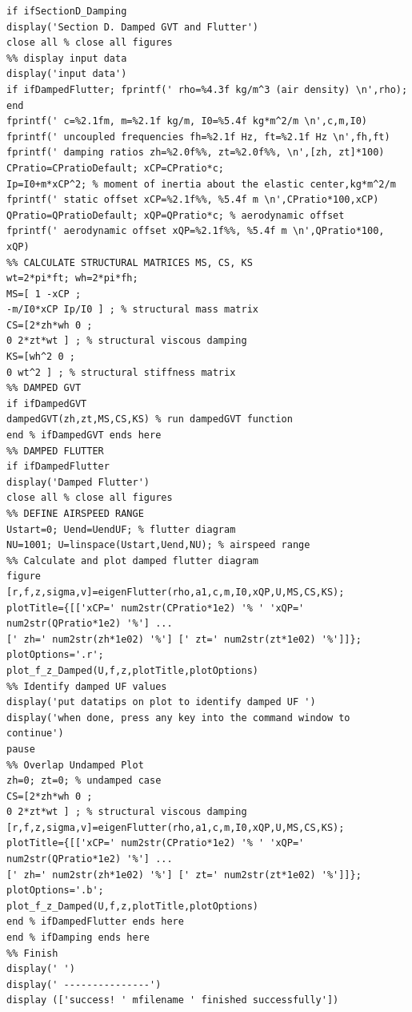 \documentclass{article}
\begin{document}
\begin{lstlisting}[caption={Main analysis script for Homework 1.}, label={lst:main_script}]
%% Section D: include damping
if ifSectionD_Damping
display('Section D. Damped GVT and Flutter')
close all % close all figures
%% display input data
display('input data')
if ifDampedFlutter; fprintf(' rho=%4.3f kg/m^3 (air density) \n',rho); end
fprintf(' c=%2.1fm, m=%2.1f kg/m, I0=%5.4f kg*m^2/m \n',c,m,I0)
fprintf(' uncoupled frequencies fh=%2.1f Hz, ft=%2.1f Hz \n',fh,ft)
fprintf(' damping ratios zh=%2.0f%%, zt=%2.0f%%, \n',[zh, zt]*100)
CPratio=CPratioDefault; xCP=CPratio*c;
Ip=I0+m*xCP^2; % moment of inertia about the elastic center,kg*m^2/m
fprintf(' static offset xCP=%2.1f%%, %5.4f m \n',CPratio*100,xCP)
QPratio=QPratioDefault; xQP=QPratio*c; % aerodynamic offset
fprintf(' aerodynamic offset xQP=%2.1f%%, %5.4f m \n',QPratio*100, xQP)
%% CALCULATE STRUCTURAL MATRICES MS, CS, KS
wt=2*pi*ft; wh=2*pi*fh;
MS=[ 1 -xCP ;
-m/I0*xCP Ip/I0 ] ; % structural mass matrix
CS=[2*zh*wh 0 ;
0 2*zt*wt ] ; % structural viscous damping
KS=[wh^2 0 ;
0 wt^2 ] ; % structural stiffness matrix
%% DAMPED GVT
if ifDampedGVT
dampedGVT(zh,zt,MS,CS,KS) % run dampedGVT function
end % ifDampedGVT ends here
%% DAMPED FLUTTER
if ifDampedFlutter
display('Damped Flutter')
close all % close all figures
%% DEFINE AIRSPEED RANGE
Ustart=0; Uend=UendUF; % flutter diagram
NU=1001; U=linspace(Ustart,Uend,NU); % airspeed range
%% Calculate and plot damped flutter diagram
figure
[r,f,z,sigma,v]=eigenFlutter(rho,a1,c,m,I0,xQP,U,MS,CS,KS);
plotTitle={[['xCP=' num2str(CPratio*1e2) '% ' 'xQP=' num2str(QPratio*1e2) '%'] ...
[' zh=' num2str(zh*1e02) '%'] [' zt=' num2str(zt*1e02) '%']]};
plotOptions='.r';
plot_f_z_Damped(U,f,z,plotTitle,plotOptions)
%% Identify damped UF values
display('put datatips on plot to identify damped UF ')
display('when done, press any key into the command window to continue')
pause
%% Overlap Undamped Plot
zh=0; zt=0; % undamped case
CS=[2*zh*wh 0 ;
0 2*zt*wt ] ; % structural viscous damping
[r,f,z,sigma,v]=eigenFlutter(rho,a1,c,m,I0,xQP,U,MS,CS,KS);
plotTitle={[['xCP=' num2str(CPratio*1e2) '% ' 'xQP=' num2str(QPratio*1e2) '%'] ...
[' zh=' num2str(zh*1e02) '%'] [' zt=' num2str(zt*1e02) '%']]};
plotOptions='.b';
plot_f_z_Damped(U,f,z,plotTitle,plotOptions)
end % ifDampedFlutter ends here
end % ifDamping ends here
%% Finish
display(' ')
display(' ---------------')
display (['success! ' mfilename ' finished successfully'])
\end{lstlisting}

\newpage
\end{document}
